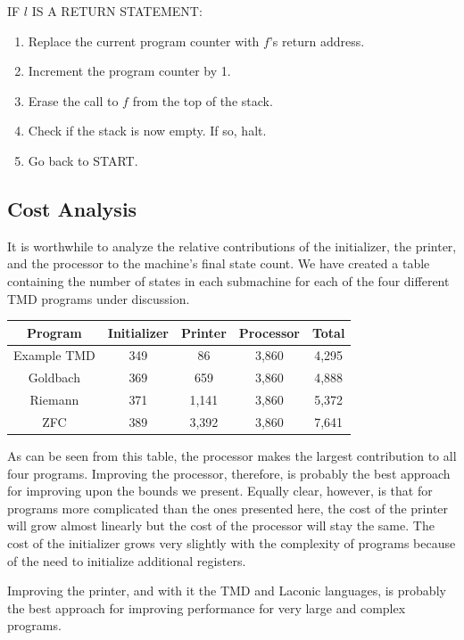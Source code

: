 \documentclass[11pt]{article}
\newcommand{\statenum}{7,641 }
\newcommand{\gbstatenum}{4,888 }
\newcommand{\rmstatenum}{5,372 }
\begin{document}
IF $l$ IS A RETURN STATEMENT:
\begin{enumerate}
\item Replace the current program counter with $f$'s return address.
\item Increment the program counter by 1.
\item Erase the call to $f$ from the top of the stack.
\item Check if the stack is now empty. If so, halt.
\item Go back to START.
\end{enumerate}

\subsection{Cost Analysis} \label{sec:cost}

It is worthwhile to analyze the relative contributions of the initializer, the printer, and the processor to the machine's final state count. We have created a table containing the number of states in each submachine for each of the four different TMD programs under discussion. 

\begin{center}
    \begin{tabular}{||c c c c c||}
    \hline
    Program & Initializer & Printer & Processor & Total \\ [0.5ex]
    \hline\hline
    Example TMD & 349 & 86 & 3,860 & 4,295 \\
    \hline
    Goldbach & 369 & 659 & 3,860 & \gbstatenum \\
    \hline
    Riemann & 371 & 1,141 & 3,860 & \rmstatenum \\
    \hline 
    ZFC & 389 & 3,392 & 3,860 & \statenum \\
    \hline
    \end{tabular}
\end{center}

As can be seen from this table, the processor makes the largest contribution to all four programs. Improving the processor, therefore, is probably the best approach for improving upon the bounds we present. Equally clear, however, is that for programs more complicated than the ones presented here, the cost of the printer will grow almost linearly but the cost of the processor will stay the same. The cost of the initializer grows very slightly with the complexity of programs because of the need to initialize additional registers. 

Improving the printer, and with it the TMD and Laconic languages, is probably the best approach for improving performance for very large and complex programs.
\end{document}

